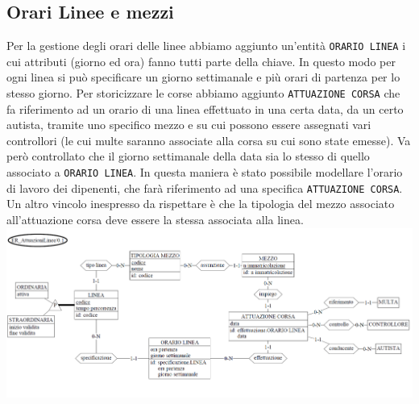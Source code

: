 \documentclass[12pt,a4paper]{report}
\begin{document}
\subsection{Orari Linee e mezzi}
Per la gestione degli orari delle linee abbiamo aggiunto un'entità \texttt{ORARIO LINEA} i cui attributi (giorno ed ora) fanno tutti parte della chiave. In questo modo per ogni linea si può specificare un giorno settimanale e più orari di partenza per lo stesso giorno. Per storicizzare le corse abbiamo aggiunto \texttt{ATTUAZIONE CORSA} che fa riferimento ad un orario di una linea effettuato in una certa data, da un certo autista, tramite uno specifico mezzo e su cui possono essere assegnati vari controllori (le cui multe saranno associate alla corsa su cui sono state emesse). Va però controllato che il giorno settimanale della data sia lo stesso di quello associato a \texttt{ORARIO LINEA}.
In questa maniera è stato possibile modellare l'orario di lavoro dei dipenenti, che farà riferimento ad una specifica \texttt{ATTUAZIONE CORSA}. Un altro vincolo inespresso da rispettare è che la tipologia del mezzo associato all'attuazione corsa deve essere la stessa associata alla linea.\\
\includegraphics[width=1.0\textwidth]{prog_conc/AttuazioniLinee}
\end{document}
